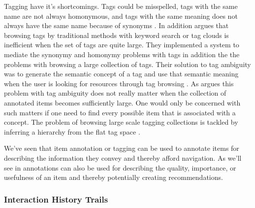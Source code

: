 Tagging have it's shortcomings. Tags could be misspelled, tags with the same
name are not always  homonymous, and tags with the same meaning does not
always have the same name because of synonyms \citep[]{aurnhammer06}. In
addition \citet[]{li07} argues that browsing tags by traditional
methods with keyword search or tag clouds is inefficient when the set of tags
are quite large. They implemented a system to mediate the synonymy and
homonymy problems with tags in addition the the problems with browsing a large
collection of tags. Their solution to tag ambiguity
was to generate the semantic concept%
of a tag and use that semantic meaning
when the user is looking for resources through tag browsing
\citep[]{li07}. As \citet[]{weinberger07} argues this problem
with tag ambiguity does not really matter when the collection of annotated
items becomes sufficiently large. One would only be concerned with such
matters if one need to find every possible item that is associated with a
concept.
The problem of browsing large scale tagging collections is tackled by
inferring a hierarchy%
from the flat tag space \citep[]{li07}.

We've seen that item annotation or tagging can be used to annotate items for
describing the information they convey and
thereby afford navigation. As we'll see in
annotations can also be used for describing the quality, importance, or
usefulness of an item and thereby potentially creating recommendations.

\subsubsection{Interaction History Trails}
\label{section:background.social.navigation.applied.forms.interaction.history}

